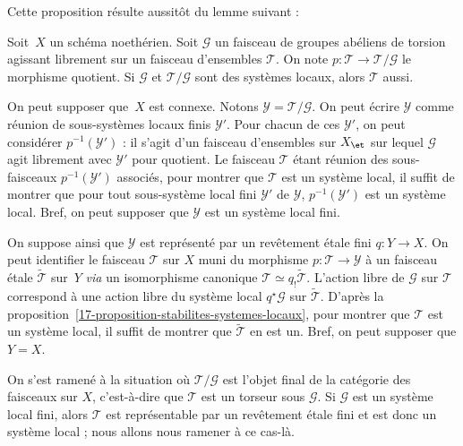 \documentclass[10pt]{../fichiers-configuration-latex/smfart}
\begin{document}
Cette proposition résulte aussitôt du lemme suivant :

\begin{lemme2}
Soit $X$ un schéma noethérien. Soit $\mathscr G$ un faisceau de groupes
abéliens de torsion agissant librement sur un faisceau d'ensembles
$\mathscr T$. On note $p\colon \mathscr T\to\mathscr T/\mathscr G$ le
morphisme quotient. Si $\mathscr G$ et $\mathscr T/\mathscr G$ sont des
systèmes locaux, alors $\mathscr T$ aussi.
\end{lemme2}

On peut supposer que $X$ est connexe.
Notons $\mathscr Y=\mathscr T/\mathscr G$. On peut écrire $\mathscr Y$
comme réunion de sous-systèmes locaux finis $\mathscr Y'$. Pour chacun de
ces $\mathscr Y'$, on peut considérer $p^{-1}(\mathscr Y')$ : il s'agit
d'un faisceau d'ensembles sur $X_\et$ sur lequel $\mathscr G$ agit
librement avec $\mathscr Y'$ pour quotient. Le faisceau $\mathscr T$ étant
réunion des sous-faisceaux $p^{-1}(\mathscr Y')$ associés, pour montrer que
$\mathscr T$ est un système local, il suffit de montrer que pour tout
sous-système local fini $\mathscr Y'$ de $\mathscr Y$, $p^{-1}(\mathscr
Y')$ est un système local. Bref, on peut supposer que $\mathscr Y$ est un
système local fini.

On suppose ainsi que $\mathscr Y$ est représenté par un revêtement étale
fini $q\colon Y\to X$. On peut identifier le faisceau $\mathscr T$ sur $X$
muni du morphisme $p\colon \mathscr T\to \mathscr Y$ à un faisceau étale
$\tilde{\mathscr T}$ sur $Y$ \emph{via}
un isomorphisme canonique $\mathscr T\simeq q_!\tilde{\mathscr T}$.
L'action libre de $\mathscr G$ sur $\mathscr T$ correspond à une action
libre du système local $q^\star \mathscr G$ sur $\tilde{\mathscr T}$.
D'après la proposition~\ref{17-proposition-stabilites-systemes-locaux}, pour
montrer que $\mathscr T$ est un système local, il suffit de montrer que
$\tilde{\mathscr T}$ en est un. Bref, on peut supposer que $Y=X$.

On s'est ramené à la situation où $\mathscr T/\mathscr G$ est l'objet final
de la catégorie des faisceaux sur $X$, c'est-à-dire que $\mathscr T$ est un
torseur sous $\mathscr G$. Si $\mathscr G$ est un système local fini, alors
$\mathscr T$ est représentable par un revêtement étale fini et est donc un
système local ; nous allons nous ramener à ce cas-là.
\end{document}
